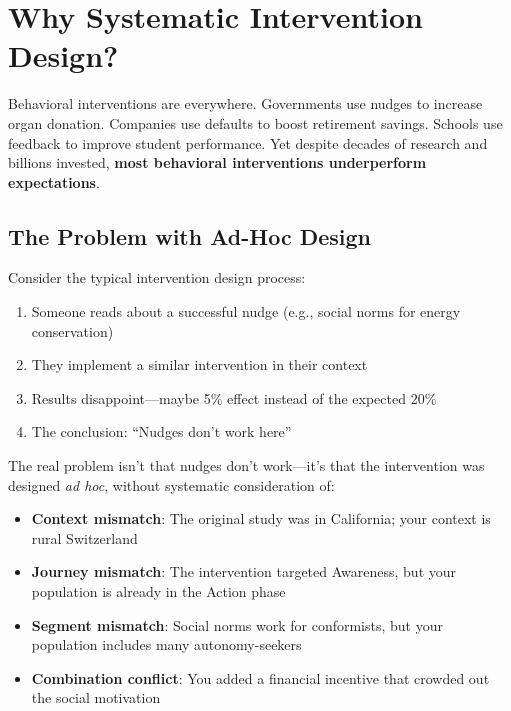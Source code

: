 \section{Why Systematic Intervention Design?}
\label{sec:17-why}

Behavioral interventions are everywhere. Governments use nudges to increase organ donation. Companies use defaults to boost retirement savings. Schools use feedback to improve student performance. Yet despite decades of research and billions invested, \textbf{most behavioral interventions underperform expectations}.

\subsection{The Problem with Ad-Hoc Design}

Consider the typical intervention design process:

\begin{enumerate}
\item Someone reads about a successful nudge (e.g., social norms for energy conservation)
\item They implement a similar intervention in their context
\item Results disappoint---maybe 5\% effect instead of the expected 20\%
\item The conclusion: ``Nudges don't work here''
\end{enumerate}

The real problem isn't that nudges don't work---it's that the intervention was designed \textit{ad hoc}, without systematic consideration of:

\begin{itemize}
\item \textbf{Context mismatch}: The original study was in California; your context is rural Switzerland
\item \textbf{Journey mismatch}: The intervention targeted Awareness, but your population is already in the Action phase
\item \textbf{Segment mismatch}: Social norms work for conformists, but your population includes many autonomy-seekers
\item \textbf{Combination conflict}: You added a financial incentive that crowded out the social motivation
\end{itemize}

